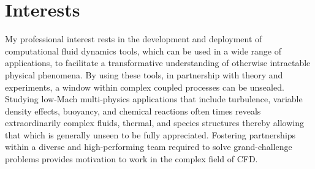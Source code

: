 \documentclass[letterpaper]{twentysecondcv_spd} %
\begin{document}
\pagestyle{headings}
\setcounter{page}{1}







\makeprofile %


\section{Interests}

My professional interest rests in the development and deployment of computational fluid dynamics 
tools, which can be used in a wide range of applications, to facilitate a transformative understanding 
of otherwise intractable physical phenomena. By using these tools, in partnership with theory and
experiments, a window within complex coupled processes can be unsealed. Studying low-Mach multi-physics 
applications that include turbulence, variable density effects, buoyancy, and chemical reactions often times
reveals extraordinarily complex fluids, thermal, and species structures thereby allowing that which is
generally unseen to be fully appreciated. Fostering partnerships within a diverse and high-performing 
team required to solve grand-challenge problems provides motivation to work in the complex field of CFD.
\end{document}
